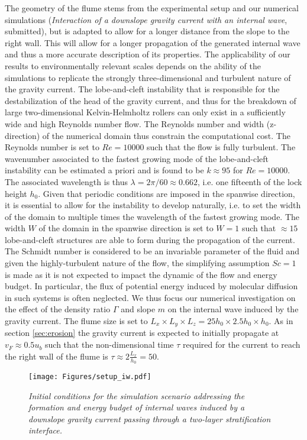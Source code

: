 \documentclass[10pt]{article}
\begin{document}
The geometry of the flume stems from the experimental setup \citep{Hogg2017} and our numerical simulations ({\it Interaction of a downslope gravity current with an internal wave}, submitted), but is adapted to allow for a longer distance from the slope to the right wall. This will allow for a longer propagation of the generated internal wave and thus a more accurate description of its properties. The applicability of our results to environmentally relevant scales depends on the ability of the simulations to replicate the strongly three-dimensional and turbulent nature of the gravity current. The lobe-and-cleft instability that is responsible for the destabilization of the head of the gravity current, and thus for the breakdown of large two-dimensional Kelvin-Helmholtz rollers can only exist in a sufficiently wide and high Reynolds number flow. The Reynolds number and width (z-direction) of the numerical domain thus constrain the computational cost. The Reynolds number is set to $Re=10000$ such that the flow is fully turbulent. The wavenumber associated to the fastest growing mode of the lobe-and-cleft instability can be estimated a priori \citep{Mechanics2012} and is found to be $k\approx 95$ for $Re=10000$. The associated wavelength is thus $\lambda=2\pi/60\approx 0.662$, i.e. one fifteenth of the lock height $h_0$. Given that periodic conditions are imposed in the spanwise direction, it is essential to allow for the instability to develop naturally, i.e. to set the width of the domain to multiple times the wavelength of the fastest growing mode. The width $W$ of the domain in the spanwise direction is set to $W=1$ such that $\approx 15$ lobe-and-cleft structures are able to form during the propagation of the current. The Schmidt number is considered to be an invariable parameter of the fluid and given the highly-turbulent nature of the flow, the simplifying assumption $Sc=1$ is made as it is not expected to impact the dynamic of the flow and energy budget. In particular, the flux of potential energy induced by molecular diffusion in such systems is often neglected. We thus focus our numerical investigation on the effect of the density ratio $\Gamma$ and slope $m$ on the internal wave induced by the gravity current. The flume size is set to $L_x\times L_y\times L_z = 25h_0\times 2.5h_0\times h_0$. As in section \ref{sec:erosion} the gravity current is expected to initially propagate at $v_F\approx 0.5u_b$ such that the non-dimensional time $\tau$ required for the current to reach the right wall of the flume is $\tau\approx 2\frac{L_x}{h_0}= 50$.  
\setlength{\unitlength}{1cm}\begin{figure}[t]
	\centering
	\texttt{[image: Figures/setup\_iw.pdf]}
	\caption{\small \textit{Initial conditions for the simulation scenario addressing the formation and energy budget of internal waves induced by a downslope gravity current passing through a two-layer stratification interface.}}
	\label{fig:setup_iw}
\end{figure} 
\end{document}
